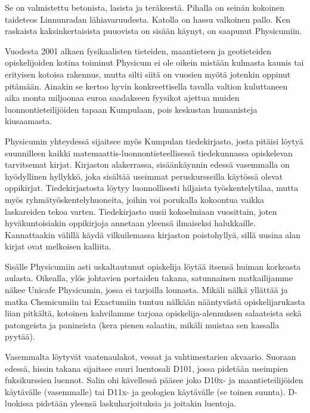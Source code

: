 \documentclass[../ala_hataile.tex]{subfiles}
\begin{document}
	\clearpage
	
	Se on valmistettu betonista, lasista ja teräksestä.
	Pihalla on seinän kokoinen taideteos
	Linnunradan lähiavaruudesta. Katolla
	on hassu valkoinen pallo. Ken raskaista
	kaksinkertaisista puuovista on sisään käynyt,
	on saapunut Physicumiin.
	
	Vuodesta 2001 alkaen fysikaalisten tieteiden,
	maantieteen ja geotieteiden opiskelijoiden
	kotina toiminut Physicum ei ole oikein
	mistään kulmasta kaunis tai erityisen
	kotoisa rakennus, mutta silti siitä on vuosien
	myötä jotenkin oppinut pitämään. Ainakin
	se kertoo hyvin konkreettisella tavalla
	valtion kuluttaneen aika monta miljoonaa
	euroa saadakseen fyysikot ajettua muiden
	luonnontieteilijöiden tapaan Kumpulaan,
	pois keskustan humanisteja kiusaamasta.
	
	Physicumin yhteydessä sijaitsee myös
	Kumpulan tiedekirjasto, josta pitäisi löytyä
	suunnilleen kaikki matemaattis-luonnon\-tieteellisessä
	tiedekunnassa opiskelevan
	tarvitsemat kirjat. Kirjaston alakerrassa,
	sisäänkäynnin edessä vasemmalla on hyödyllinen
	hyllykkö, joka
	sisältää useimmat peruskursseilla käytössä olevat oppikirjat. Tiedekirjastosta
	löytyy luonnollisesti hiljaista
	työskentelytilaa, mutta myös ryhmä\-työskentely\-huoneita,
	joihin voi porukalla kokoontua
	vaikka laskareiden tekoa varten.
	Tiedekirjasto uusii kokoelmiaan vuosittain,
	joten hyväkuntoisiakin oppikirjoja annetaan
	yleensä ilmaiseksi halukkaille.
	Kannattaakin välillä käydä vilkuilemassa kirjaston poistohyllyä, sillä
	uusina alan kirjat ovat melkoisen kalliita.
	
	Sisälle Physicumiin asti uskaltautunut
	opiskelija löytää itsensä huiman korkeasta
	aulasta. Oikealla, ylös johtavien portaiden
	takana, satunnainen matkailijamme näkee
	Unicafe Physicumin, jossa ei tarjoilla
	lounasta. Mikäli nälkä yllättää ja matka
	Chemicumiin tai Exactumiin tuntuu nälkään
	nääntyvästä opiskelijarukasta liian
	pitkältä, kotoinen kahvilamme tarjoaa opiskelija-alennuksen salaateista sekä patongeista ja panineista
	(kera pienen salaatin, mikäli muistaa sen kassalla
	pyytää).
	
	Vasemmalta löytyvät vaatenaulakot,
	vessat ja vahtimestarien
	akvaario. Suoraan
	edessä, hissin takana sijaitsee suuri
	luentosali D101, jossa pidetään useimpien
	fuksikurssien luennot. Salin ohi kävellessä
	pääsee joko D10x- ja maantieteilijöiden
	käytävälle (vasemmalle) tai D11x- ja
	geologien käytävälle (se toinen suunta).
	D-luokissa pidetään yleensä laskuharjoituksia ja joitakin luentoja.
	
\end{document}
